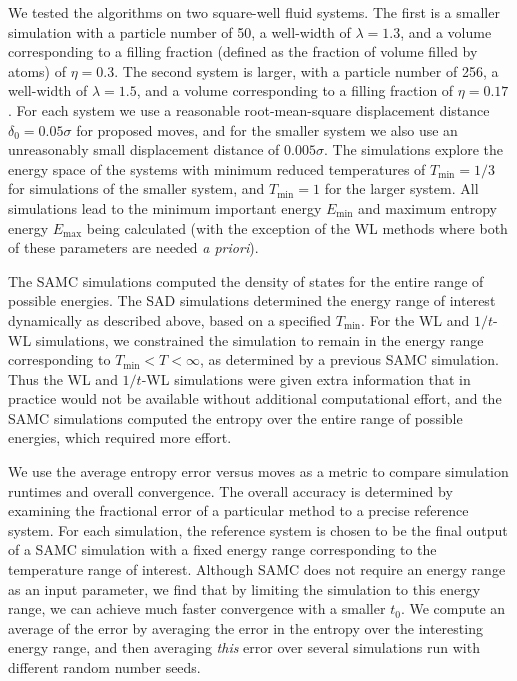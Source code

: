 \documentclass[letterpaper,twocolumn,amsmath,amssymb,pre,aps,10pt]{revtex4-1}
\begin{document}
We tested the algorithms on two square-well fluid systems.  The first
is a smaller simulation with a particle number of 50, a well-width of
$\lambda = 1.3$, and a volume corresponding to a filling fraction
(defined as the fraction of volume filled by atoms) of $\eta =
0.3$. The second system is larger, with a particle number of 256, a
well-width of $\lambda = 1.5$, and a volume corresponding to a filling
fraction of $\eta = 0.17$.  For each system we use a reasonable
root-mean-square displacement distance $\delta_0 = 0.05\sigma$ for
proposed moves, and for the smaller system we also use an unreasonably
small displacement distance of $0.005\sigma$. The simulations explore
the energy space of the systems with minimum reduced temperatures of
$T_{\text{min}} = 1/3$ for simulations of the smaller system, and
$T_{\min}=1$ for the larger system.  All simulations lead to the
minimum important energy $E_{\min}$ and maximum entropy energy
$E_{\max}$ being calculated (with the exception of the WL methods
where both of these parameters are needed \emph{a priori}).

The SAMC simulations
computed the density of states for the entire range of possible
energies.  The SAD simulations determined the energy range of interest
dynamically as described above, based on a specified $T_{\min}$.  For
the WL and $1/t$-WL simulations, we constrained the simulation to
remain in the energy range corresponding to $T_{\min} < T < \infty$,
as determined by a previous SAMC simulation.  Thus the WL and $1/t$-WL
simulations were given extra information that in practice would not be
available without additional computational effort, and the SAMC simulations
computed the entropy over the entire range of possible energies, which
required more effort.

We use the average entropy error versus moves as a metric to compare
simulation runtimes and overall convergence. The overall accuracy
is determined by examining the fractional error of a particular method to
a precise reference system. For each simulation, the reference system
is chosen to be the final output of a SAMC simulation with a fixed energy range
corresponding to the temperature range of interest.
Although SAMC does not require an energy range as an input parameter,
we find that by limiting the simulation to this energy range, we can
achieve much faster convergence with a smaller $t_0$.  We compute an average
of the error by averaging the error in the entropy over the
interesting energy range, and then averaging \emph{this} error over several
simulations run with different random number seeds.
\end{document}
